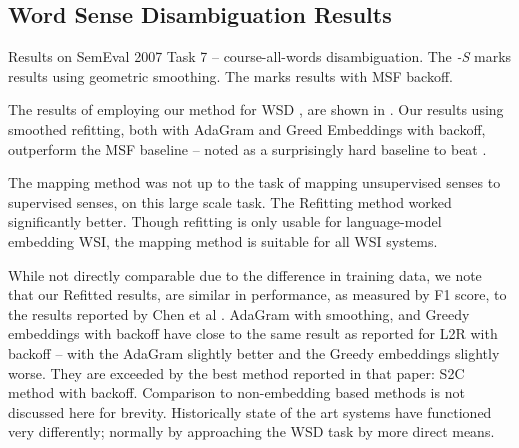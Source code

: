 \documentclass{llncs}
\def\parencite{\cite}
\begin{document}
\subsection{Word Sense Disambiguation Results} \label{WSDtask}
\begin{table}
	\begin{adjustbox}{max width=\columnwidth}
	\end{adjustbox}

	\caption{Results on SemEval 2007 Task 7 -- course-all-words disambiguation.
	The \emph{-S} marks results using geometric smoothing.
	The \emph{\textasteriskcentered } marks results with MSF backoff.
	} \label{samevalres}
\end{table}

The results of employing our method for WSD , are shown in .
Our results using smoothed refitting, both with AdaGram and Greed Embeddings with backoff, outperform the MSF baseline  \cite{Navigli:2007:STC:1621474.1621480}  -- noted as a surprisingly hard baseline to beat \parencite{Chen2014}.

The mapping method \parencite{agirre2006}  was not up to the task of mapping unsupervised senses to supervised senses, on this large scale task.
The Refitting method worked significantly better.
Though refitting is only usable for language-model embedding WSI, the mapping method is suitable for all WSI systems.

While not directly comparable due to the difference in training data, we note that our Refitted results, are similar in performance, as measured by F1 score, to the results reported by Chen et al \parencite{Chen2014}.
AdaGram with smoothing, and Greedy embeddings with backoff have close to the same result as reported for L2R with backoff -- with the AdaGram slightly better and the Greedy embeddings slightly worse.
They are exceeded by the best method reported in that paper: S2C method with backoff.
Comparison to non-embedding based methods is not discussed here for brevity.
Historically state of the art systems have functioned very differently; normally by approaching the WSD task by more direct means. %
\end{document}
